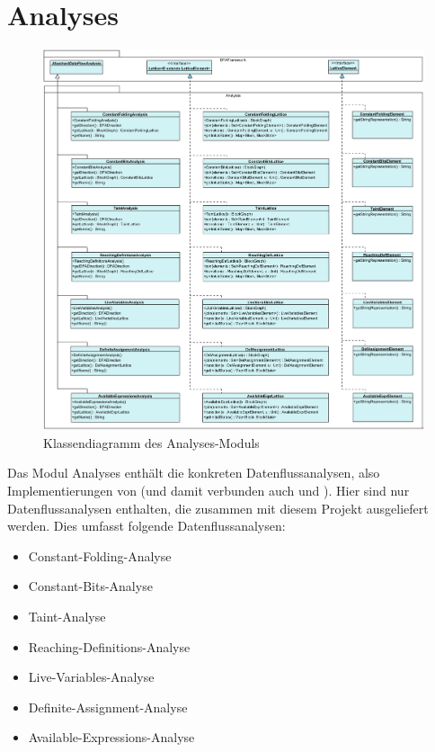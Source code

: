 
\section{Analyses}

\begin{figure}[htbp] 
	\centering
	\includegraphics[width=1\textwidth]{Klassenuebersicht/Analyses/Analyses}
	\caption{Klassendiagramm des Analyses-Moduls}
	\label{fig:Analyses}
\end{figure}

Das Modul Analyses enthält die konkreten Datenflussanalysen, also Implementierungen von  (und damit verbunden auch  und ).
Hier sind nur Datenflussanalysen enthalten, die zusammen mit diesem Projekt ausgeliefert werden.
Dies umfasst folgende Datenflussanalysen:
\begin{itemize}
	\item Constant-Folding-Analyse
	\item Constant-Bits-Analyse
	\item Taint-Analyse
	\item Reaching-Definitions-Analyse
	\item Live-Variables-Analyse
	\item Definite-Assignment-Analyse
	\item Available-Expressions-Analyse
\end{itemize}

